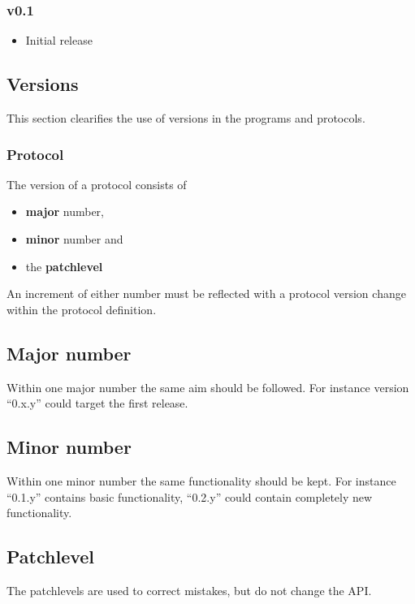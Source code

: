 \documentclass[12pt,a4paper]{book}
\begin{document}
\subsubsection{v0.1}
\begin{itemize}
\item Initial release
\end{itemize}
\subsection{Versions}
This section clearifies the use of versions in the programs and protocols.
\subsubsection{Protocol}
The version of a protocol consists of 
\begin{itemize}
\item \textbf{major} number,
\item \textbf{minor} number and
\item the \textbf{patchlevel}
\end{itemize}
An increment of either number must be reflected with a protocol version change
within the protocol definition.
\subsection{Major number}
Within one major number the same aim should be followed. For instance
version "`0.x.y"' could target the first release.
\subsection{Minor number}
Within one minor number the same functionality should be kept.
For instance "`0.1.y"' contains basic functionality, "`0.2.y"' could
contain completely new functionality.
\subsection{Patchlevel}
The patchlevels are used to correct mistakes, but do not change the API.
\end{document}
